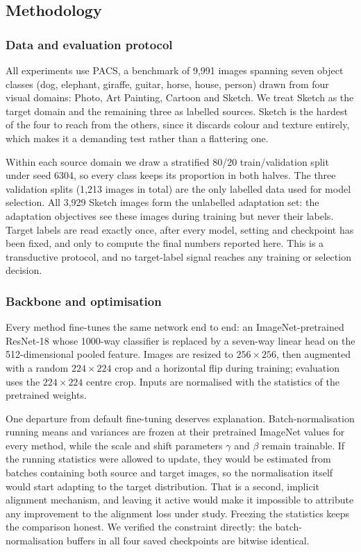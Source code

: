 \subsection{Methodology}

\subsubsection{Data and evaluation protocol}

All experiments use PACS, a benchmark of 9{,}991 images spanning seven object
classes (dog, elephant, giraffe, guitar, horse, house, person) drawn from four
visual domains: Photo, Art Painting, Cartoon and Sketch. We treat Sketch as the
target domain and the remaining three as labelled sources. Sketch is the hardest
of the four to reach from the others, since it discards colour and texture
entirely, which makes it a demanding test rather than a flattering one.

Within each source domain we draw a stratified 80/20 train/validation split under
seed 6304, so every class keeps its proportion in both halves. The three
validation splits (1{,}213 images in total) are the only labelled data used for
model selection. All 3{,}929 Sketch images form the unlabelled adaptation set:
the adaptation objectives see these images during training but never their
labels. Target labels are read exactly once, after every model, setting and
checkpoint has been fixed, and only to compute the final numbers reported here.
This is a transductive protocol, and no target-label signal reaches any training
or selection decision.

\subsubsection{Backbone and optimisation}

Every method fine-tunes the same network end to end: an ImageNet-pretrained
ResNet-18 whose 1000-way classifier is replaced by a seven-way linear head on the
512-dimensional pooled feature. Images are resized to $256 \times 256$, then
augmented with a random $224 \times 224$ crop and a horizontal flip during
training; evaluation uses the $224 \times 224$ centre crop. Inputs are normalised
with the statistics of the pretrained weights.

One departure from default fine-tuning deserves explanation. Batch-normalisation
running means and variances are frozen at their pretrained ImageNet values for
every method, while the scale and shift parameters $\gamma$ and $\beta$ remain
trainable. If the running statistics were allowed to update, they would be
estimated from batches containing both source and target images, so the
normalisation itself would start adapting to the target distribution. That is a
second, implicit alignment mechanism, and leaving it active would make it
impossible to attribute any improvement to the alignment loss under study.
Freezing the statistics keeps the comparison honest. We verified the constraint
directly: the batch-normalisation buffers in all four saved checkpoints are
bitwise identical.

